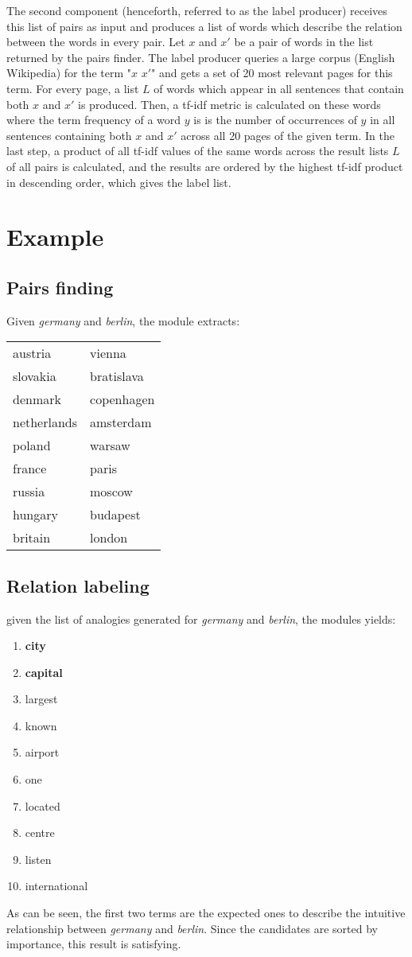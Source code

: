 \documentclass[11pt,a4paper]{article}
\begin{document}
The second component (henceforth, referred to as the label producer) receives this list of pairs as input and produces a list of words which describe the relation between the words in every pair. Let $x$ and $x'$ be a pair of words in the list returned by the pairs finder. The label producer queries a large corpus (English Wikipedia) for the term "$x$ $x'$" and gets a set of 20 most relevant pages for this term. For every page, a list $L$ of words which appear in all sentences that contain both $x$ and $x'$ is produced. Then, a tf-idf metric is calculated on these words where the term frequency of a word $y$ is is the number of occurrences of $y$ in all sentences containing both $x$ and $x'$ across all 20 pages of the given term. In the last step, a product of all tf-idf values of the same words across the result lists $L$ of all pairs is calculated, and the results are ordered by the highest tf-idf product in descending order, which gives the label list.
\section{Example}
\subsection{Pairs finding}
 Given \textit{germany} and \textit{berlin}, the module extracts:
\begin{tabular}{ l l }
  austria & vienna \\
  slovakia & bratislava \\
  denmark & copenhagen \\
  netherlands & amsterdam \\
  poland & warsaw \\
  france & paris \\
  russia & moscow \\
  hungary & budapest \\
  britain & london

\end{tabular}

\subsection{Relation labeling}
 given the list of analogies generated for \textit{germany} and \textit{berlin}, the modules yields:
\begin{enumerate}
\itemsep0em 
\item \textbf{city}
\item \textbf{capital}
\item largest
\item known
\item airport
\item one
\item located
\item centre
\item listen
\item international
\end{enumerate}
As can be seen, the first two terms are the expected ones to describe the intuitive relationship between \textit{germany} and \textit{berlin}. Since the candidates are sorted by importance, this result is satisfying.
\end{document}

